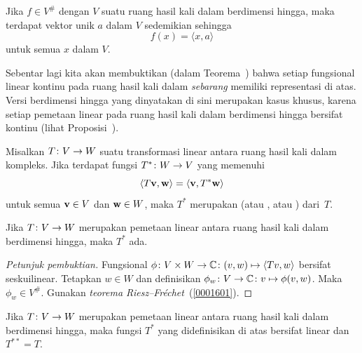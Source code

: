 \begin{thm}\label{0001601} Jika $f \in V^{\#}$ dengan $V$ suatu
ruang hasil kali dalam berdimensi hingga, maka terdapat vektor unik $a$ dalam $V$ sedemikian
sehingga
    \[ f(x) = \langle x,a \rangle \]
untuk semua $x$ dalam $V$.
\end{thm}

Sebentar lagi kita akan membuktikan (dalam Teorema~) bahwa setiap fungsional linear kontinu pada ruang hasil
kali dalam \emph{sebarang} memiliki representasi di atas. Versi berdimensi hingga yang dinyatakan di sini merupakan kasus khusus, karena
setiap pemetaan linear pada ruang hasil kali dalam berdimensi hingga bersifat kontinu (lihat Proposisi~).

\begin{defn}\label{0001602} Misalkan $T\colon V \rightarrow W$ suatu transformasi linear antara ruang
hasil kali dalam kompleks. Jika terdapat fungsi $T^*\colon W \rightarrow V$ yang memenuhi
   \[ \langle T\mathbf{v},\mathbf{w} \rangle = \langle \mathbf{v},T^*\mathbf{w} \rangle \]
untuk semua $\mathbf{v} \in V$ dan $\mathbf{w} \in W$, maka $T^*$ merupakan
 (atau , atau ) dari~$T$.
\end{defn}

\begin{prop}\label{00016021} Jika $T\colon V \rightarrow W$ merupakan pemetaan linear antara ruang
hasil kali dalam berdimensi hingga, maka $T^*$ ada.
\end{prop}

\begin{proof}[\emph{Petunjuk pembuktian}] Fungsional $\phi\colon V \times W \rightarrow \mathbb{C} \colon
(v,w) \mapsto \langle Tv,w \rangle$ bersifat seskuilinear. Tetapkan $w \in W$ dan definisikan $\phi_w
\colon V \rightarrow \mathbb{C} \colon v \mapsto \phi(v,w)$. Maka $\phi_w \in V^{\#}$. Gunakan
\emph{teorema Riesz--Fr\'echet}~(\ref{0001601}). \ns
\end{proof}

\begin{prop} Jika $T\colon V \rightarrow W$ merupakan pemetaan linear antara ruang hasil kali dalam
berdimensi hingga, maka fungsi $T^*$ yang didefinisikan di atas bersifat linear dan $T^{**} = T$.
\end{prop}

